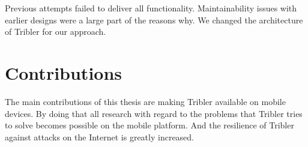 Previous attempts failed to deliver all functionality. \cite{bsc_1,2,3}
Maintainability issues with earlier designs were a large part of the reasons why.
We changed the architecture of Tribler for our approach.

\section{Contributions}
The main contributions of this thesis are making Tribler available on mobile devices.
By doing that all research with regard to the problems that Tribler tries to solve becomes possible on the mobile platform.
And the resilience of Tribler against attacks on the Internet is greatly increased.


